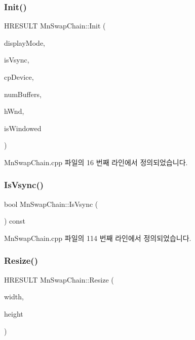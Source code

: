 \subsubsection{\texorpdfstring{Init()}{Init()}}
{\footnotesize\ttfamily H\+R\+E\+S\+U\+LT Mn\+Swap\+Chain\+::\+Init (\begin{DoxyParamCaption}\item[{const \hyperlink{struct_m_n_l_1_1_mn_display_mode}{Mn\+Display\+Mode} \&}]{display\+Mode,  }\item[{bool}]{is\+Vsync,  }\item[{const \hyperlink{namespace_m_n_l_a1eec210db8f309a4a9ac0d9658784c31}{C\+P\+D3\+D\+Device}}]{cp\+Device,  }\item[{U\+I\+NT}]{num\+Buffers,  }\item[{H\+W\+ND}]{h\+Wnd,  }\item[{bool}]{is\+Windowed }\end{DoxyParamCaption})}



Mn\+Swap\+Chain.\+cpp 파일의 16 번째 라인에서 정의되었습니다.

\mbox{\label{class_m_n_l_1_1_mn_swap_chain_ae81b83e544f6d3e10f6f2801dad88312}} 
\subsubsection{\texorpdfstring{Is\+Vsync()}{IsVsync()}}
{\footnotesize\ttfamily bool Mn\+Swap\+Chain\+::\+Is\+Vsync (\begin{DoxyParamCaption}{ }\end{DoxyParamCaption}) const}



Mn\+Swap\+Chain.\+cpp 파일의 114 번째 라인에서 정의되었습니다.

\mbox{\label{class_m_n_l_1_1_mn_swap_chain_a446289287507e85585146834f13c5b76}} 
\subsubsection{\texorpdfstring{Resize()}{Resize()}}
{\footnotesize\ttfamily H\+R\+E\+S\+U\+LT Mn\+Swap\+Chain\+::\+Resize (\begin{DoxyParamCaption}\item[{U\+I\+NT}]{width,  }\item[{U\+I\+NT}]{height }\end{DoxyParamCaption})}



